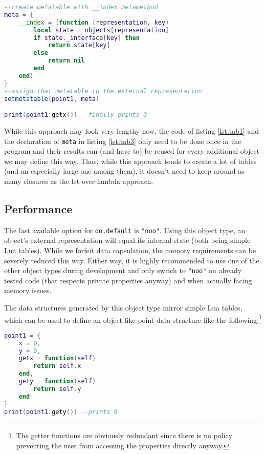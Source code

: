 \begin{lstlisting}[language=lua, caption={Accessing the public methods of the internal state directly through the external representation (continued from listing \ref{lst:tab2})}, label=lst:tab3, name=lst:tab]
--create metatable with __index metamethod
meta = {
	__index = (function (representation, key)
		local state = objects[representation]
		if state._interface[key] then
			return state[key]
		else
			return nil
		end
	end)
}
--assign that metatable to the external representation
setmetatable(point1, meta)

print(point1:getx()) --finally prints 0
\end{lstlisting}

While this approach may look very lengthy now, the code of listing \ref{lst:tab1} and the declaration of \texttt{meta} in listing \ref{lst:tab3} only need to be done once in the program and their results can (and have to) be reused for every additional object we may define this way. Thus, while this approach tends to create a lot of tables (and an especially large one among them), it doesn't need to keep around as many closures as the let-over-lambda approach.

\subsection{Performance}
\label{sec:oo:performance}

The last available option for \texttt{oo.default} is \texttt{"noo"}. Using this object type, an object's external representation will equal its internal state (both being simple Lua tables). While we forfeit data capsulation, the memory requirements can be severely reduced this way. Either way, it is highly recommended to use one of the other object types during development and only switch to \texttt{"noo"} on already tested code (that respects private properties anyway) and when actually facing memory issues. 

The data structures generated by this object type mirror simple Lua tables, which can be used to define an object-like point data structure like the following:\footnote{The getter functions are obviously redundant since there is no policy preventing the user from accessing the properties directly anyway.}

\begin{lstlisting}[language=lua, caption={Possible implementation of a point using Lua's tables}, label=lst:noo, name=lst:noo]
point1 = {
	x = 0,
	y = 0,
	getx = function(self)
		return self.x
	end,
	gety = function(self)
		return self.y
	end
}
print(point1:gety()) --prints 0
\end{lstlisting}

